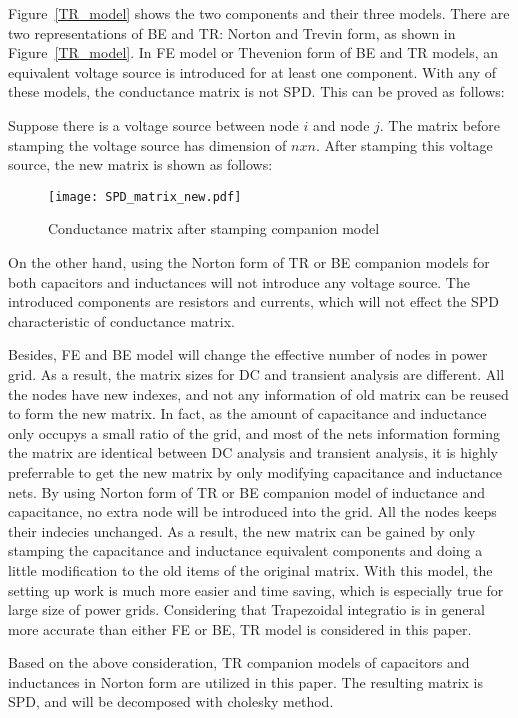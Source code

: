 \documentclass[conference]{IEEEtran}
\begin{document}
Figure~\ref{TR_model} shows the two components and their three models. There are two representations of BE and TR: Norton and Trevin form, as shown 
in Figure~\ref{TR_model}. In FE model or Thevenion form of BE and TR models, an equivalent voltage source is introduced for at least one component. 
With any of these models, the conductance matrix is not SPD. This can be proved as follows: 

Suppose there is a voltage source between node $i$ and node $j$. The matrix before stamping the voltage source has dimension of $nxn$. 
After stamping this voltage source, the new matrix is shown as follows:
\begin{figure}[htbp]
 \centering
 \texttt{[image: SPD\_matrix\_new.pdf]}
 \caption{Conductance matrix after stamping companion model}
 \label{SPD_matrix}
\end{figure} 

On the other hand, using the Norton form of TR or BE companion models for both capacitors and inductances will not introduce any 
voltage source. The introduced components are resistors and currents, which will not effect the SPD characteristic of conductance matrix. 
 
Besides, FE and BE model will change the effective number of nodes in power grid. As a result, the matrix sizes for DC and transient analysis are different. All the nodes have new indexes, and not any information of old matrix can be reused to form the new matrix. In fact, as 
the amount of capacitance and inductance only occupys a small ratio of the grid, and most of the nets
information forming the matrix are identical between DC analysis and transient analysis, it is highly preferrable to get the new matrix by
only modifying capacitance and inductance nets. By using Norton form of TR or BE companion model of inductance and capacitance, no extra 
node 
will be introduced into the grid. All the nodes keeps their indecies unchanged. As a result, the new matrix can be gained by only stamping
the capacitance and inductance equivalent components and doing a little modification to the old items of the original matrix. With this
model, the setting up work is much more easier and time saving, which is especially true for large size of power grids. Considering that 
Trapezoidal integratio is in general more accurate than either FE or BE\cite{ECE552}, TR model is considered in this paper.

Based on the above consideration, TR companion models of capacitors and inductances in Norton form are utilized in this paper. The 
resulting matrix is SPD, and will be decomposed with cholesky method.
\end{document}
